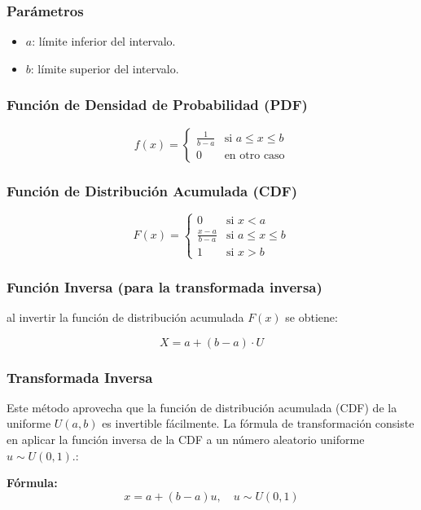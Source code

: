 \documentclass{article}
\begin{document}
\subsubsection*{Parámetros}
\begin{itemize}
  \item $a$: límite inferior del intervalo.
  \item $b$: límite superior del intervalo.
\end{itemize}

\subsubsection*{Función de Densidad de Probabilidad (PDF)}
\[
f(x) =
\begin{cases}
\frac{1}{b - a} & \text{si } a \leq x \leq b \\
0 & \text{en otro caso}
\end{cases}
\]

\subsubsection*{Función de Distribución Acumulada (CDF)}
\[
F(x) =
\begin{cases}
0 & \text{si } x < a \\
\frac{x - a}{b - a} & \text{si } a \leq x \leq b \\
1 & \text{si } x > b
\end{cases}
\]
\subsubsection*{Función Inversa (para la transformada inversa)}
al invertir la función de distribución acumulada $F(x)$ se obtiene:

\[
X = a + (b - a) \cdot U
\]

\subsubsection{Transformada Inversa}
Este método aprovecha que la función de distribución acumulada (CDF) de la uniforme $U(a,b)$ es invertible fácilmente. La fórmula de transformación consiste en aplicar la función inversa de la CDF a un número aleatorio uniforme $u \sim U(0,1)$.:

\textbf{Fórmula:}
\begin{equation}
x = a + (b-a)u, \quad u \sim U(0,1)
\end{equation}
\end{document}
